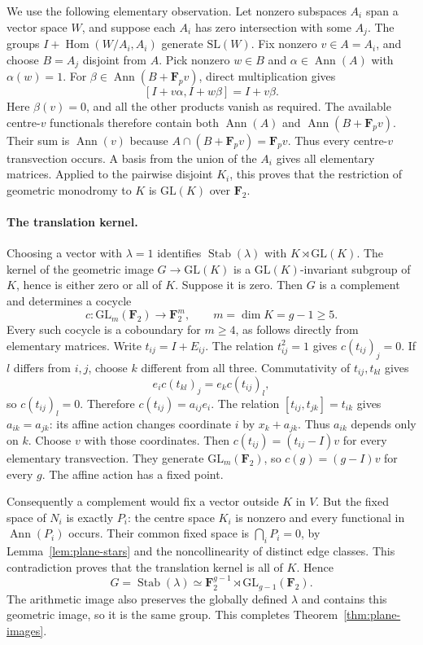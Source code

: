 \documentclass[11pt]{article}
\begin{document}
We use the following elementary observation. Let nonzero subspaces $A_i$ span a vector space $W$, and suppose each $A_i$ has zero intersection with some $A_j$. The groups $I+\operatorname{Hom}(W/A_i,A_i)$ generate $\mathrm{SL}(W)$. Fix nonzero $v\in A=A_i$, and choose $B=A_j$ disjoint from $A$. Pick nonzero $w\in B$ and $\alpha\in\operatorname{Ann}(A)$ with $\alpha(w)=1$. For $\beta\in\operatorname{Ann}(B+\mathbf F_pv)$, direct multiplication gives
\[
 [I+v\alpha,I+w\beta]=I+v\beta.
\]
Here $\beta(v)=0$, and all the other products vanish as required. The available centre-$v$ functionals therefore contain both $\operatorname{Ann}(A)$ and $\operatorname{Ann}(B+\mathbf F_pv)$. Their sum is $\operatorname{Ann}(v)$ because $A\cap(B+\mathbf F_pv)=\mathbf F_pv$. Thus every centre-$v$ transvection occurs. A basis from the union of the $A_i$ gives all elementary matrices. Applied to the pairwise disjoint $K_i$, this proves that the restriction of geometric monodromy to $K$ is $\mathrm{GL}(K)$ over $\mathbf F_2$.

\paragraph{The translation kernel.}
Choosing a vector with $\lambda=1$ identifies $\operatorname{Stab}(\lambda)$ with $K\rtimes\mathrm{GL}(K)$. The kernel of the geometric image $G\to\mathrm{GL}(K)$ is a $\mathrm{GL}(K)$-invariant subgroup of $K$, hence is either zero or all of $K$. Suppose it is zero. Then $G$ is a complement and determines a cocycle
\[
 c:\mathrm{GL}_m(\mathbf F_2)\longrightarrow\mathbf F_2^m,
                    \qquad m=\dim K=g-1\ge5.
\]
Every such cocycle is a coboundary for $m\ge4$, as follows directly from elementary matrices. Write $t_{ij}=I+E_{ij}$. The relation $t_{ij}^2=1$ gives $c(t_{ij})_j=0$. If $l$ differs from $i,j$, choose $k$ different from all three. Commutativity of $t_{ij},t_{kl}$ gives
\[
 e_i c(t_{kl})_j=e_k c(t_{ij})_l,
\]
so $c(t_{ij})_l=0$. Therefore $c(t_{ij})=a_{ij}e_i$. The relation $[t_{ij},t_{jk}]=t_{ik}$ gives $a_{ik}=a_{jk}$: its affine action changes coordinate $i$ by $x_k+a_{jk}$. Thus $a_{ik}$ depends only on $k$. Choose $v$ with those coordinates. Then $c(t_{ij})=(t_{ij}-I)v$ for every elementary transvection. They generate $\mathrm{GL}_m(\mathbf F_2)$, so $c(g)=(g-I)v$ for every $g$. The affine action has a fixed point.

Consequently a complement would fix a vector outside $K$ in $V$. But the fixed space of $N_i$ is exactly $P_i$: the centre space $K_i$ is nonzero and every functional in $\operatorname{Ann}(P_i)$ occurs. Their common fixed space is $\bigcap_iP_i=0$, by Lemma~\ref{lem:plane-stars} and the noncollinearity of distinct edge classes. This contradiction proves that the translation kernel is all of $K$. Hence
\[
 G=\operatorname{Stab}(\lambda)
   \simeq\mathbf F_2^{g-1}\rtimes\mathrm{GL}_{g-1}(\mathbf F_2).
\]
The arithmetic image also preserves the globally defined $\lambda$ and contains this geometric image, so it is the same group. This completes Theorem~\ref{thm:plane-images}.
\end{document}
